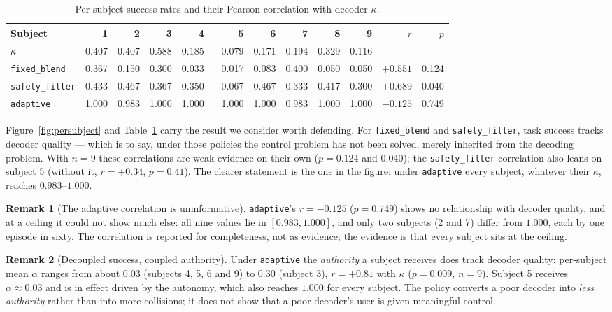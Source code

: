 \documentclass[11pt,a4paper]{article}
\newcommand{\vfixed}{\texttt{fixed\_blend}}
\newcommand{\vadapt}{\texttt{adaptive}}
\newcommand{\vsafety}{\texttt{safety\_filter}}
\theoremstyle{plain}
\theoremstyle{definition}
\newtheorem{remark}{Remark}
\begin{document}
\begin{table}[htbp]
\centering
\footnotesize
\begin{tabular}{@{}lrrrrrrrrrrr@{}}
\toprule
Subject & 1 & 2 & 3 & 4 & 5 & 6 & 7 & 8 & 9 & $r$ & $p$\\
\midrule
$\kappa$ & 0.407 & 0.407 & 0.588 & 0.185 & $-0.079$ & 0.171 & 0.194 & 0.329 & 0.116 & --- & ---\\
\midrule
\vfixed  & 0.367 & 0.150 & 0.300 & 0.033 & 0.017 & 0.083 & 0.400 & 0.050 & 0.050 & $+0.551$ & 0.124\\
\vsafety & 0.433 & 0.467 & 0.367 & 0.350 & 0.067 & 0.467 & 0.333 & 0.417 & 0.300 & $+0.689$ & 0.040\\
\vadapt  & 1.000 & 0.983 & 1.000 & 1.000 & 1.000 & 1.000 & 0.983 & 1.000 & 1.000 & $-0.125$ & 0.749\\
\bottomrule
\end{tabular}
\caption{Per-subject success rates and their Pearson correlation with
decoder $\kappa$.}
\label{tab:persubject}
\end{table}

Figure~\ref{fig:persubject} and Table~\ref{tab:persubject} carry the
result we consider worth defending. For \vfixed{} and
\vsafety{}, task success tracks decoder quality --- which is to say,
under those policies the control problem has not been solved, merely
inherited from the decoding problem. With $n = 9$ these correlations are
weak evidence on their own ($p = 0.124$ and $0.040$); the \vsafety{}
correlation also leans on subject 5 (without it, $r = +0.34$, $p = 0.41$).
The clearer statement is the one in the figure: under \vadapt{} every
subject, whatever their $\kappa$, reaches $0.983$--$1.000$.

\begin{remark}[The adaptive correlation is uninformative]
\vadapt{}'s $r = -0.125$ ($p = 0.749$) shows no relationship with
decoder quality, and at a ceiling it could not show much else: all nine
values lie in $[0.983, 1.000]$, and only two subjects (2 and 7) differ
from $1.000$, each by one episode in sixty. The correlation is reported
for completeness, not as evidence; the evidence is that every subject
sits at the ceiling.
\end{remark}

\begin{remark}[Decoupled success, coupled authority]
Under \vadapt{} the \emph{authority} a subject receives does track
decoder quality: per-subject mean $\alpha$ ranges from about $0.03$
(subjects 4, 5, 6 and 9) to $0.30$ (subject 3), $r = +0.81$ with
$\kappa$ ($p = 0.009$, $n = 9$). Subject 5 receives $\alpha \approx 0.03$
and is in effect driven by the autonomy, which also reaches $1.000$ for
every subject. The policy converts a poor decoder into \emph{less
authority} rather than into more collisions; it does not show that a
poor decoder's user is given meaningful control.
\end{remark}
\end{document}
